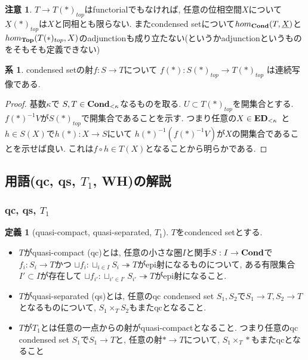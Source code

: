 \documentclass[dvipdfmx,a4paper,11pt]{article}
\theoremstyle{definition}
\newtheorem{cor}[thm]{系}
\newtheorem{dfn}[thm]{定義}
\newtheorem{rem}[thm]{注意}
\begin{document}
\begin{rem}
$T \to T(\ast)_{top}$はfunctorialでもなければ, 任意の位相空間$X$について$\underline{X}(\ast)_{top}$は$X$と同相とも限らない. またcondensed setについて$hom_{{\bf Cond}}(T,\underline{X})$と$hom_{{\bf Top}}(T(\ast)_{top}, X)$のadjunctionも成り立たない(というかadjunctionというものをそもそも定義できない)
\end{rem}
  \begin{tcolorbox}
 [colback = white, colframe = green!35!black, fonttitle = \bfseries,breakable = true]
  \begin{cor}
  condensed setの射$f : S\to T$について
  $f(\ast) : S(\ast)_{top} \to T(\ast)_{top}$
  は連続写像である.
 \end{cor}
  \end{tcolorbox}
 \begin{proof}
 基数$\kappa$で
 $S, T \in {\bf Cond}_{< \kappa}$なるものを取る.
 $U \subset T(\ast)_{top}$を開集合とする. 
 $f(\ast)^{-1}V$が$S(\ast)_{top} $で開集合であることを示す.
 つまり任意の$X \in {\bf ED}_{<\kappa}$ と$h \in S(X)$で$h(\ast): X \to S$にいて
 $h(\ast)^{-1}(f(\ast)^{-1}V)$が$X$の開集合であることを示せば良い.
 これは$f \circ h \in T(X)$となることから明らかである. 
 \end{proof}


\subsection{用語(qc, qs, $T_1$, WH)の解説}
\subsubsection{qc, qs, $T_1$}

 \begin{tcolorbox}
 [colback = white, colframe = green!35!black, fonttitle = \bfseries,breakable = true]
\begin{dfn}[quasi-compact, quasi-separated, $T_1$]
$T$をcondenced setとする. 
\begin{itemize}
\item $T$がquasi-compact (qc)とは, 任意の小さな圏$I$と関手$S : I \to {\bf Cond}$で$f_i : S_i \to T$かつ
$\sqcup f_i : \sqcup_{i \in I} S_i \twoheadrightarrow T$がepi射になるものについて, 
ある有限集合$I' \subset I$が存在して
$\sqcup f_{i'} : \sqcup_{i' \in I'} S_{i'} \twoheadrightarrow T$がepi射になること.
\item $T$がquasi-separated (qs)とは, 任意のqc condensed set $S_1, S_2$で$S_1 \to T, S_2\to T$となるものについて, $S_1 \times_{T}S_2$もまたqcとなること.
\item $T$が$T_1$とは任意の一点からの射がquasi-compactとなること. 
つまり任意のqc condensed set $S_1$で$S_1 \to T$と, 任意の射$\ast \to T$について, $S_1 \times_{T}\ast$もまたqcとなること 
\end{itemize}
\end{dfn}
 \end{tcolorbox}
 
\end{document}
